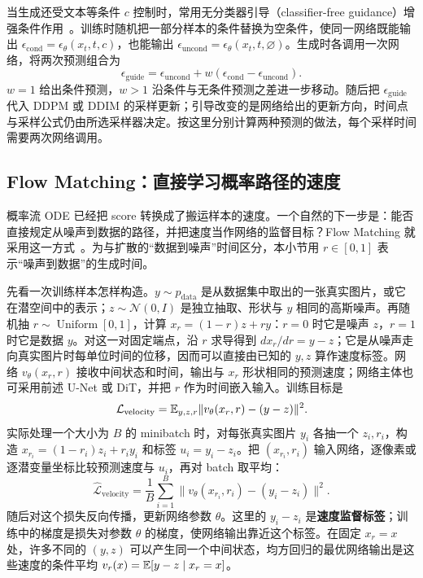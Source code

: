 当生成还受文本等条件 \(c\) 控制时，常用无分类器引导（classifier-free guidance）增强条件作用~\cite{ho2022classifierfree}。训练时随机把一部分样本的条件替换为空条件，使同一网络既能输出 \(\epsilon_{\mathrm{cond}}=\epsilon_\theta(x_t,t,c)\)，也能输出 \(\epsilon_{\mathrm{uncond}}=\epsilon_\theta(x_t,t,\varnothing)\)。生成时各调用一次网络，将两次预测组合为
\begin{equation}
 \epsilon_{\mathrm{guide}}=\epsilon_{\mathrm{uncond}}+w(\epsilon_{\mathrm{cond}}-\epsilon_{\mathrm{uncond}}).
 \label{eq:cfg}
\end{equation}
\(w=1\) 给出条件预测，\(w>1\) 沿条件与无条件预测之差进一步移动。随后把 \(\epsilon_{\mathrm{guide}}\) 代入 DDPM 或 DDIM 的采样更新；引导改变的是网络给出的更新方向，时间点与采样公式仍由所选采样器决定。按这里分别计算两种预测的做法，每个采样时间需要两次网络调用。

\subsection{Flow Matching：直接学习概率路径的速度}

概率流 ODE 已经把 score 转换成了搬运样本的速度。一个自然的下一步是：能否直接规定从噪声到数据的路径，并把速度当作网络的监督目标？Flow Matching 就采用这一方式~\cite{lipman2023flow}。为与扩散的“数据到噪声”时间区分，本小节用 \(r\in[0,1]\) 表示“噪声到数据”的生成时间。

先看一次训练样本怎样构造。\(y\sim p_{\mathrm{data}}\) 是从数据集中取出的一张真实图片，或它在潜空间中的表示；\(z\sim\mathcal N(0,I)\) 是独立抽取、形状与 \(y\) 相同的高斯噪声。再随机抽 \(r\sim\operatorname{Uniform}[0,1]\)，计算 \(x_r=(1-r)z+ry\)：\(r=0\) 时它是噪声 \(z\)，\(r=1\) 时它是数据 \(y\)。对这一对固定端点，沿 \(r\) 求导得到 \(dx_r/dr=y-z\)；它是从噪声走向真实图片时每单位时间的位移，因而可以直接由已知的 \(y,z\) 算作速度标签。网络 \(v_\theta(x_r,r)\) 接收中间状态和时间，输出与 \(x_r\) 形状相同的预测速度；网络主体也可采用前述 U-Net 或 DiT，并把 \(r\) 作为时间嵌入输入。训练目标是
\begin{equation}
 \mathcal L_{\mathrm{velocity}}
 =\mathbb{E}_{y,z,r}\|v_\theta(x_r,r)-(y-z)\|^2.
 \label{eq:flow-matching}
\end{equation}
实际处理一个大小为 \(B\) 的 minibatch 时，对每张真实图片 \(y_i\) 各抽一个 \(z_i,r_i\)，构造 \(x_{r_i}=(1-r_i)z_i+r_i y_i\) 和标签 \(u_i=y_i-z_i\)。把 \((x_{r_i},r_i)\) 输入网络，逐像素或逐潜变量坐标比较预测速度与 \(u_i\)，再对 batch 取平均：
\begin{equation}
 \widehat{\mathcal L}_{\mathrm{velocity}}=\frac1B\sum_{i=1}^{B}
 \|v_\theta(x_{r_i},r_i)-(y_i-z_i)\|^2.
 \label{eq:flow-matching-batch}
\end{equation}
随后对这个损失反向传播，更新网络参数 \(\theta\)。这里的 \(y_i-z_i\) 是\textbf{速度监督标签}；训练中的梯度是损失对参数 \(\theta\) 的梯度，使网络输出靠近这个标签。在固定 \(x_r=x\) 处，许多不同的 \((y,z)\) 可以产生同一个中间状态，均方回归的最优网络输出是这些速度的条件平均 \(v_r(x)=\mathbb{E}[y-z\mid x_r=x]\)。

